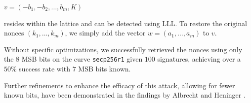 \documentclass[a4paper,12pt]{report}
\begin{document}
\begin{center}
    $v = (-b_1, -b_2, \ldots, b_m, K)$
\end{center}

resides within the lattice and can be detected using LLL. To restore the original nonces $(k_1, \ldots, k_m)$, we simply add the vector $w = (a_1, \ldots, a_m)$ to $v$.

Without specific optimizations, we successfully retrieved the nonces using only the $8$ MSB bits on the curve \texttt{secp256r1} given $100$ signatures, achieving over a $50\%$ success rate with $7$ MSB bits known.

Further refinements to enhance the efficacy of this attack, allowing for fewer known bits, have been demonstrated in the findings by Albrecht and Heninger \cite{ecdsa_result}.
\end{document}
